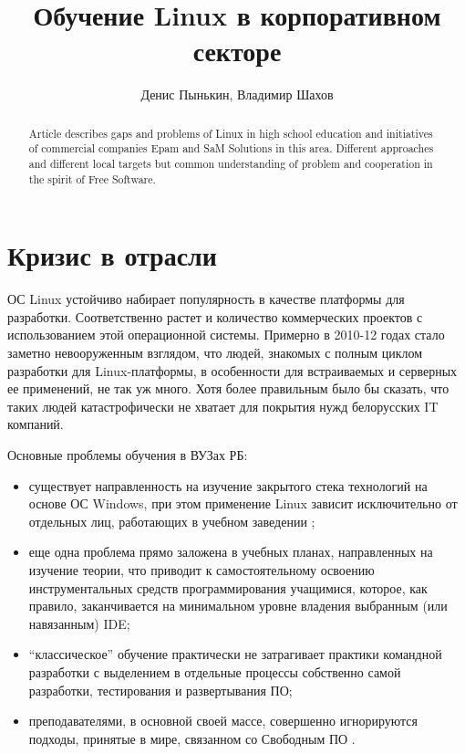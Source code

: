 \documentclass[10pt, a5paper]{article}
\begin{document}
\title{Обучение Linux в корпоративном секторе}
\author{Денис Пынькин, Владимир Шахов}
\maketitle
\begin{abstract}
Article describes gaps and problems of Linux in high school education and initiatives of commercial companies Epam and SaM Solutions in this area. Different approaches and different local targets but common understanding of problem and cooperation in the spirit of Free Software.
\end{abstract}
\section*{Кризис в отрасли}

ОС Linux устойчиво набирает популярность в качестве платформы для разработки. Соответственно растет и количество коммерческих проектов с использованием этой операционной системы. Примерно в 2010-12 годах стало заметно невооруженным взглядом, что людей, знакомых с полным циклом разработки
для Linux-платформы, в особенности для встраиваемых и серверных ее применений, не так уж много. Хотя более правильным было бы сказать, что таких людей катастрофически не хватает для покрытия нужд белорусских IT компаний.

Основные проблемы обучения в ВУЗах РБ:

\begin{itemize}
  \item существует направленность на изучение закрытого стека технологий на основе ОС Windows, при этом применение Linux зависит исключительно от отдельных лиц, работающих в учебном заведении \cite{bib1};
  \item еще одна проблема прямо заложена в учебных планах, направленных на изучение теории, что приводит к самостоятельному освоению инструментальных средств программирования учащимися, которое, как правило, заканчивается на минимальном уровне владения выбранным (или навязанным) IDE;
  \item “классическое” обучение практически не затрагивает практики командной разработки с выделением в отдельные процессы собственно самой разработки, тестирования и развертывания ПО;
  \item преподавателями, в основной своей массе, совершенно игнорируются подходы, принятые в мире, связанном со Свободным ПО \cite{bib2}.
\end{itemize}
\end{document}
